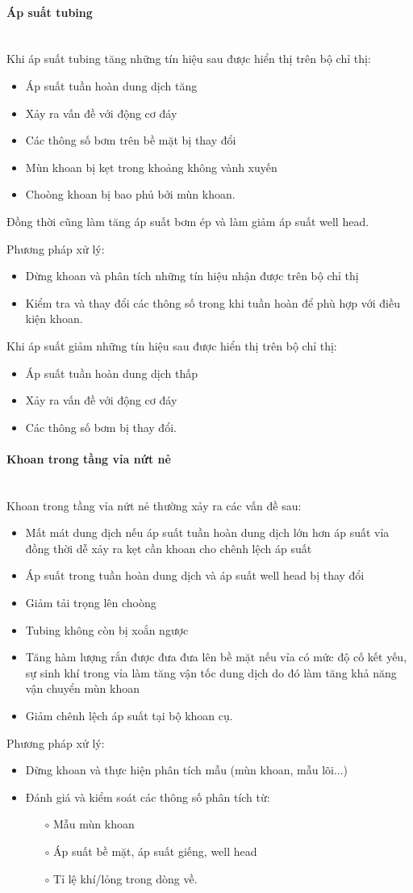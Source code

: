 \documentclass[12pt,a4paper]{article}
\newcommand{\subsubsubsection}[1]{\paragraph{#1}\mbox{}\\}
\begin{document}
	\subsubsubsection{Áp suất tubing}
	Khi áp suất tubing tăng những tín hiệu sau được hiển thị trên bộ chỉ thị:
	\begin{itemize}
		\item Áp suất tuần hoàn dung dịch tăng
		\item Xảy ra vấn đề với động cơ đáy
		\item Các thông số bơm trên bề mặt bị thay đổi
		\item Mùn khoan bị kẹt trong khoảng không vành xuyến
		\item Choòng khoan bị bao phủ bởi mùn khoan.
	\end{itemize}
	Đồng thời cũng làm tăng áp suất bơm ép và làm giảm áp suất well head. \par
	Phương pháp xử lý:
	\begin{itemize}
		\item Dừng khoan và phân tích những tín hiệu nhận được trên bộ chỉ thị
		\item Kiểm tra và thay đổi các thông số trong khi tuần hoàn để phù hợp với điều kiện khoan.
	\end{itemize}
	Khi áp suất giảm những tín hiệu sau được hiển thị trên bộ chỉ thị:
	\begin{itemize}
		\item Áp suất tuần hoàn dung dịch thấp
		\item Xảy ra vấn đề với động cơ đáy
		\item Các thông số bơm bị thay đổi.
	\end{itemize}
	\subsubsubsection{Khoan trong tầng vỉa nứt nẻ}
	Khoan trong tầng vỉa nứt nẻ thường xảy ra các vấn đề sau:
	\begin{itemize}
		\item Mất mát dung dịch nếu áp suất tuần hoàn dung dịch lớn hơn áp suất vỉa đồng thời dễ xảy ra kẹt cần khoan cho chênh lệch áp suất 
		\item Áp suất trong tuần hoàn dung dịch và áp suất well head bị thay đổi
		\item Giảm tải trọng lên choòng
		\item Tubing không còn bị xoắn ngược
		\item Tăng hàm lượng rắn được đưa đưa lên bề mặt nếu vỉa có mức độ cố kết yếu, sự sinh khí trong vỉa làm tăng vận tốc dung dịch do đó làm tăng khả năng vận chuyển mùn khoan
		\item Giảm chênh lệch áp suất tại bộ khoan cụ.
	\end{itemize}
	Phương pháp xử lý:
	\begin{itemize}
		\item Dừng khoan và thực hiện phân tích mẫu (mùn khoan, mẫu lõi...)
		\item Đánh giá và kiểm soát các thông số phân tích từ:
		\begin{itemize}
			\item[$\circ$] Mẫu mùn khoan
			\item[$\circ$] Áp suất bề mặt, áp suất giếng, well head
			\item[$\circ$] Tỉ lệ khí/lỏng trong dòng về.
		\end{itemize}
	\end{itemize}	
\end{document}
